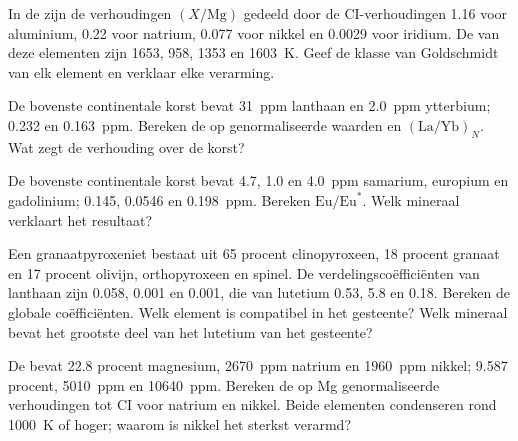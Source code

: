 \begin{exercise}[$\star$]\label{exo:b2:elements-in-the-earth:2}
In de  zijn de verhoudingen $(X/\mathrm{Mg})$ gedeeld door de CI-verhoudingen
1.16 voor aluminium, 0.22 voor natrium, 0.077 voor nikkel en 0.0029 voor
iridium. De  van deze elementen zijn 1653, 958, 1353
en \qty{1603}{K}. Geef de klasse van Goldschmidt van elk element en verklaar elke
verarming.
\end{exercise}

\begin{exercise}[$\star$]\label{exo:b2:elements-in-the-earth:3}
De bovenste continentale korst bevat \qty{31}{ppm} lanthaan en \qty{2.0}{ppm}
ytterbium;  0.232 en \qty{0.163}{ppm}. Bereken de
op  genormaliseerde waarden en $(\mathrm{La}/\mathrm{Yb})_N$. Wat zegt de
verhouding over de korst?
\end{exercise}

\begin{exercise}[$\star$]\label{exo:b2:elements-in-the-earth:4}
De bovenste continentale korst bevat 4.7, 1.0 en \qty{4.0}{ppm} samarium,
europium en gadolinium;  0.145, 0.0546 en \qty{0.198}{ppm}.
Bereken $\mathrm{Eu}/\mathrm{Eu}^*$. Welk mineraal verklaart het resultaat?
\end{exercise}

\begin{exercise}[$\star\star$]\label{exo:b2:elements-in-the-earth:5}
Een granaatpyroxeniet bestaat uit 65 procent clinopyroxeen, 18 procent granaat en
17 procent olivijn, orthopyroxeen en spinel. De verdelingscoëfficiënten van
lanthaan zijn 0.058, 0.001 en 0.001, die van lutetium 0.53, 5.8 en 0.18.
Bereken de globale coëfficiënten. Welk element is compatibel in het gesteente? Welk
mineraal bevat het grootste deel van het lutetium van het gesteente?
\end{exercise}

\begin{exercise}[$\star\star$]\label{exo:b2:elements-in-the-earth:6}
De  bevat 22.8 procent magnesium, \qty{2670}{ppm}
natrium en \qty{1960}{ppm} nikkel;  9.587 procent,
\qty{5010}{ppm} en \qty{10640}{ppm}. Bereken de op Mg genormaliseerde verhoudingen tot CI voor
natrium en nikkel. Beide elementen condenseren rond \qty{1000}{K} of hoger; waarom is
nikkel het sterkst verarmd?
\end{exercise}

